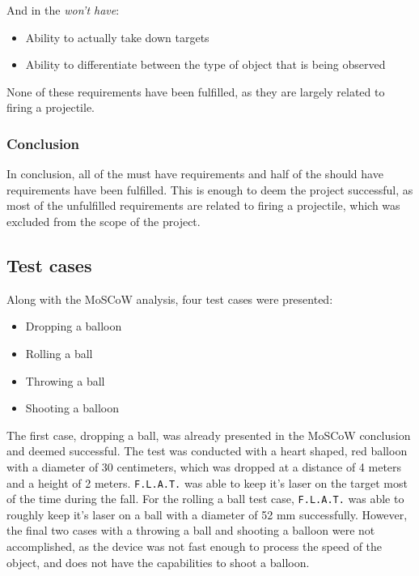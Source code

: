 And in the \textit{won't have}:
\begin{itemize}
	\item Ability to actually take down targets
	\item Ability to differentiate between the type of object that is being observed
\end{itemize}

None of these requirements have been fulfilled, as they are largely related to firing a projectile.

\subsubsection{Conclusion}
In conclusion, all of the must have requirements and half of the should have requirements have been fulfilled.
This is enough to deem the project successful, as most of the unfulfilled requirements are related to firing a projectile, which was excluded from the scope of the project. 

\subsection{Test cases}
Along with the MoSCoW analysis, four test cases were presented: 
\begin{itemize}
    \item Dropping a balloon
    \item Rolling a ball
    \item Throwing a ball
    \item Shooting a balloon
\end{itemize}

The first case, dropping a ball, was already presented in the MoSCoW conclusion and deemed successful.
The test was conducted with a heart shaped, red balloon with a diameter of 30 centimeters, which was dropped at a distance of 4 meters and a height of 2 meters. 
\texttt{F.L.A.T.} was able to keep it's laser on the target most of the time during the fall. 
For the rolling a ball test case, \texttt{F.L.A.T.} was able to roughly keep it's laser on a ball with a diameter of 52 mm successfully. 
However, the final two cases with a throwing a ball and shooting a balloon were not accomplished, as the device was not fast enough to process the speed of the object, and does not have the capabilities to shoot a balloon.

